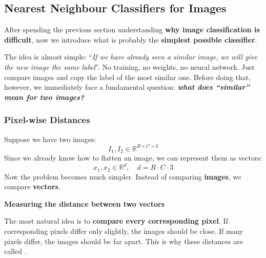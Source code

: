 \subsection{Nearest Neighbour Classifiers for Images}\label{sec:nearest-neighbour-classifiers-for-images}

After spending the previous section understanding \textbf{why image classification is difficult}, now we introduce what is probably the \textbf{simplest possible classifier}.

\highspace
The idea is almost simple: ``\emph{If we have already seen a similar image, we will give the new image the same label}''. No training, no weights, no neural network. Just compare images and copy the label of the most similar one. Before doing that, however, we immediately face a fundamental question: \emph{\textbf{what does ``similar'' mean for two images?}}

\longline

\subsubsection{Pixel-wise Distances}\label{sec:pixel-wise-distances}

Suppose we have two images:
\begin{equation*}
    I_1, I_2 \in \mathbb{R}^{R \times C \times 3}
\end{equation*}
Since we already know how to flatten an image, we can represent them as vectors:
\begin{equation*}
    x_1, x_2 \in \mathbb{R}^{d}, \quad d = R \cdot C \cdot 3
\end{equation*}
Now the problem becomes much simpler. Instead of comparing \textbf{images}, we compare \textbf{vectors}.

\highspace
\begin{flushleft}
    \textcolor{Green3}{ \textbf{Measuring the distance between two vectors}}
\end{flushleft}
The most natural idea is to \textbf{compare every corresponding pixel}. If corresponding pixels differ only slightly, the images should be close. If many pixels differ, the images should be far apart. This is why these distances are called .

